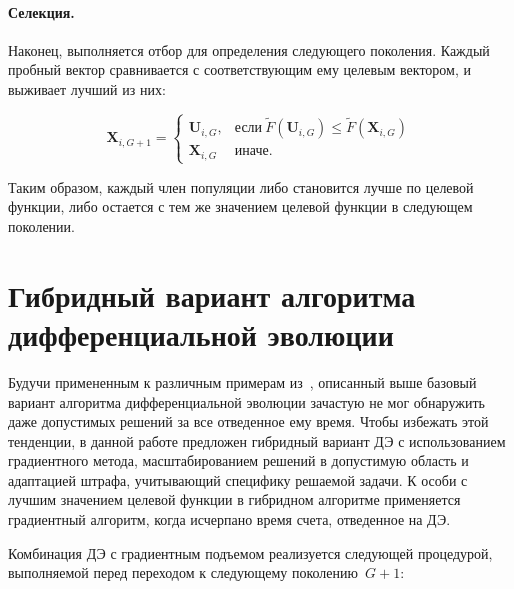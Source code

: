 \paragraph*{Селекция.}

Наконец, выполняется отбор для определения следующего поколения. Каждый пробный вектор сравнивается с соответствующим
ему целевым вектором, и выживает лучший из них:

\begin{equation}\label{eq:de_sel}
  \textbf{X}_{i,G+1} =
  \begin{cases}
    \textbf{U}_{i,G}, & \mbox{если} \ \tilde{F}(\textbf{U}_{i,G}) \leq \tilde{F}(\textbf{X}_{i,G}) \\
    \textbf{X}_{i,G} & \mbox{иначе}.
  \end{cases}
\end{equation}

Таким образом, каждый член популяции либо становится лучше по целевой функции, либо остается с тем же значением
целевой функции в следующем поколении.

\section{Гибридный вариант алгоритма дифференциальной эволюции}
Будучи примененным к различным примерам из~\cite{tyu:daor}, описанный выше базовый вариант алгоритма
дифференциальной эволюции зачастую не мог обнаружить даже допустимых решений за все отведенное ему время.
Чтобы избежать этой тенденции, в данной работе предложен гибридный вариант ДЭ с использованием градиентного метода,
масштабированием решений в допустимую область и адаптацией штрафа, учитывающий специфику решаемой задачи.
К особи с лучшим значением целевой функции в гибридном алгоритме применяется градиентный алгоритм, когда
исчерпано время счета, отведенное на ДЭ.

Комбинация ДЭ с градиентным подъемом реализуется следующей процедурой, выполняемой перед переходом к следующему поколению~$G+1$:

